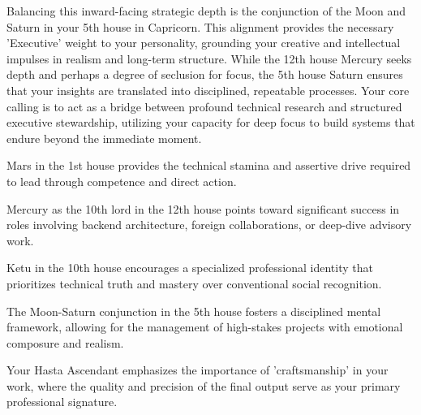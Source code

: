 {\fontsize{9}{13}\selectfont Balancing this inward-facing strategic depth is the conjunction of the Moon and Saturn in your 5th house in Capricorn. This alignment provides the necessary 'Executive' weight to your personality, grounding your creative and intellectual impulses in realism and long-term structure. While the 12th house Mercury seeks depth and perhaps a degree of seclusion for focus, the 5th house Saturn ensures that your insights are translated into disciplined, repeatable processes. Your core calling is to act as a bridge between profound technical research and structured executive stewardship, utilizing your capacity for deep focus to build systems that endure beyond the immediate moment.}\par\vspace{1.8mm}

\begin{diamondlist}
  \item {\fontsize{8.5}{12}\selectfont Mars in the 1st house provides the technical stamina and assertive drive required to lead through competence and direct action.}
  \item {\fontsize{8.5}{12}\selectfont Mercury as the 10th lord in the 12th house points toward significant success in roles involving backend architecture, foreign collaborations, or deep-dive advisory work.}
  \item {\fontsize{8.5}{12}\selectfont Ketu in the 10th house encourages a specialized professional identity that prioritizes technical truth and mastery over conventional social recognition.}
  \item {\fontsize{8.5}{12}\selectfont The Moon-Saturn conjunction in the 5th house fosters a disciplined mental framework, allowing for the management of high-stakes projects with emotional composure and realism.}
  \item {\fontsize{8.5}{12}\selectfont Your Hasta Ascendant emphasizes the importance of 'craftsmanship' in your work, where the quality and precision of the final output serve as your primary professional signature.}
\end{diamondlist}


\label{topic66}

